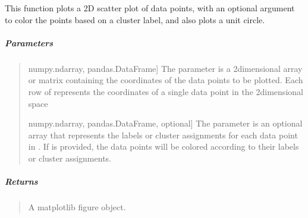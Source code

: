 \documentclass[letterpaper,10pt,english,openany,oneside]{sphinxmanual}
\begin{document}
{{{{\begin{fulllineitems}
\label{\detokenize{api_reference/generated/QuadratiK.tools.plot_clusters_2d:QuadratiK.tools.plot_clusters_2d}}
\pysigstartsignatures
{}
\pysigstopsignatures
\sphinxAtStartPar
This function plots a 2D scatter plot of data points,
with an optional argument to color the points based on
a cluster label, and also plots a unit circle.


\subparagraph{Parameters}
\label{\detokenize{api_reference/generated/QuadratiK.tools.plot_clusters_2d:parameters}}\begin{quote}
\begin{description}
\sphinxlineitem{x}{[}numpy.ndarray, pandas.DataFrame{]}
\sphinxAtStartPar
The parameter  is a 2\sphinxhyphen{}dimensional array or matrix
containing the coordinates of the data points to be plotted.
Each row of  represents the coordinates of a single data point
in the 2\sphinxhyphen{}dimensional space

\sphinxlineitem{y}{[}numpy.ndarray, pandas.DataFrame, optional{]}
\sphinxAtStartPar
The parameter  is an optional array that represents the labels
or cluster assignments for each data point in .
If  is provided, the data points will be colored according to their
labels or cluster assignments.

\end{description}
\end{quote}


\subparagraph{Returns}
\label{\detokenize{api_reference/generated/QuadratiK.tools.plot_clusters_2d:returns}}\begin{quote}

\sphinxAtStartPar
A matplotlib figure object.
\end{quote}



\end{fulllineitems}}}}}
\end{document}
